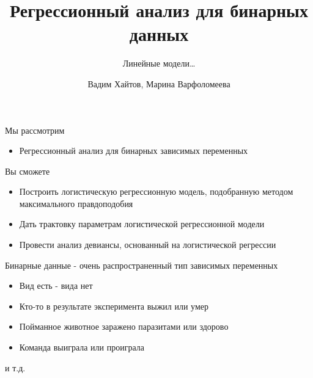 \documentclass[ignorenonframetext,]{beamer}
\title{Регрессионный анализ для бинарных данных}
\subtitle{Линейные модели\ldots{}}
\author{Вадим Хайтов, Марина Варфоломеева}
\date{}
\providecommand{\tightlist}{%
\setlength{\itemsep}{0pt}\setlength{\parskip}{0pt}}
\begin{document}
\frame{\titlepage}

\begin{frame}{Мы рассмотрим}

\begin{itemize}
\tightlist
\item
  Регрессионный анализ для бинарных зависимых переменных
\end{itemize}

\begin{block}{Вы сможете}

\begin{itemize}
\tightlist
\item
  Построить логистическую регрессионную модель, подобранную методом
  максимального правдоподобия
\item
  Дать трактовку параметрам логистической регрессионной модели
\item
  Провести анализ девиансы, основанный на логистической регрессии
\end{itemize}

\end{block}

\end{frame}

\begin{frame}{Бинарные данные - очень распространенный тип зависимых
переменных}

\begin{itemize}
\tightlist
\item
  Вид есть - вида нет
\item
  Кто-то в результате эксперимента выжил или умер
\item
  Пойманное животное заражено паразитами или здорово
\item
  Команда выиграла или проиграла
\end{itemize}

и т.д.

\end{frame}
\end{document}
